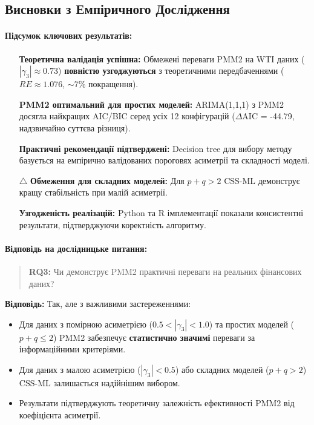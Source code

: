 \documentclass[12pt,a4paper]{article}
\begin{document}
\subsection{Висновки з Емпіричного Дослідження}
\label{subsec:wti_empirical_conclusions}

\paragraph{Підсумок ключових результатів:}

\begin{enumerate}
    \item[\checkmark] \textbf{Теоретична валідація успішна:} Обмежені переваги PMM2 на WTI даних ($|\gamma_3| \approx 0.73$) \textbf{повністю узгоджуються} з теоретичними передбаченнями ($RE \approx 1.076$, $\sim$7\% покращення).

    \item[\checkmark] \textbf{PMM2 оптимальний для простих моделей:} ARIMA(1,1,1) з PMM2 досягла найкращих AIC/BIC серед усіх 12 конфігурацій ($\Delta$AIC = -44.79, надзвичайно суттєва різниця).

    \item[\checkmark] \textbf{Практичні рекомендації підтверджені:} Decision tree для вибору методу базується на емпірично валідованих пороговях асиметрії та складності моделі.

    \item[$\triangle$] \textbf{Обмеження для складних моделей:} Для $p+q > 2$ CSS-ML демонструє кращу стабільність при малій асиметрії.

    \item[\checkmark] \textbf{Узгодженість реалізацій:} Python та R імплементації показали консистентні результати, підтверджуючи коректність алгоритму.
\end{enumerate}

\paragraph{Відповідь на дослідницьке питання:}

\begin{quote}
\textbf{RQ3:} Чи демонструє PMM2 практичні переваги на реальних фінансових даних?
\end{quote}

\noindent\textbf{Відповідь:} Так, але з важливими застереженнями:
\begin{itemize}
    \item Для даних з помірною асиметрією ($0.5 < |\gamma_3| < 1.0$) та простих моделей ($p+q \leq 2$) PMM2 забезпечує \textbf{статистично значимі} переваги за інформаційними критеріями.
    \item Для даних з малою асиметрією ($|\gamma_3| < 0.5$) або складних моделей ($p+q > 2$) CSS-ML залишається надійнішим вибором.
    \item Результати підтверджують теоретичну залежність ефективності PMM2 від коефіцієнта асиметрії.
\end{itemize}
\end{document}
